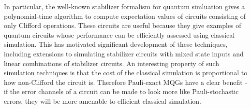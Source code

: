 \documentclass[aps,nofootinbib,pra,notitlepage,twocolumn]{revtex4-1}
\newcommand{\0}{\ensuremath{\mathbf{0}}}
\begin{document}
In particular, the well-known stabilizer formalism \cite{quant-ph/9807006} for quantum simluation gives a polynomial-time algorithm to compute expectation values of circuits consisting of only Clifford operations. These circuits are useful because they give examples of quantum circuits whose performance can be efficiently assessed using classical simulation. This has motivated significant development of these techniques, including extensions to simulating stabilizer circuits with mixed state inputs\cite{Aaronson2004} and linear combinations of stabilizer circuits. \cite{Yoder, Bennink2017} An interesting property of such simulation techniques is that the cost of the classical simulation is proportional to how non-Clifford the circuit is. Therefore Pauli-exact MQGs have a clear benefit - if the error channels of a circuit can be made to look more like Pauli-stochastic errors, they will be more amenable to efficient classical simulation. 
\end{document}
